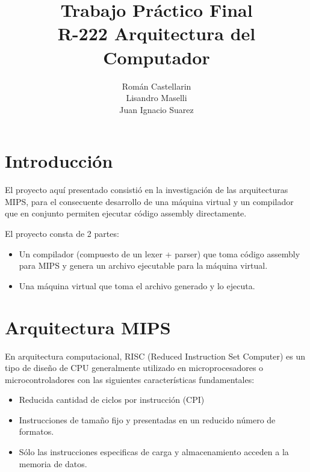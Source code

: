 \documentclass[12pt]{article}
\begin{document}
\title{
Trabajo Práctico Final \\
\large R-222 Arquitectura del Computador}
\author{ Román Castellarin\\
Lisandro Maselli\\
Juan Ignacio Suarez}
\maketitle
\section{Introducción}
El proyecto aquí presentado consistió en la investigación de las arquitecturas MIPS, para el consecuente desarrollo de una máquina virtual y un compilador que en conjunto permiten ejecutar código assembly directamente.

El proyecto consta de 2 partes:
\begin{itemize}
\item Un compilador (compuesto de un lexer + parser) que toma código assembly para MIPS y genera un archivo ejecutable para la máquina virtual.
\item Una máquina virtual que toma el archivo generado y lo ejecuta.
\end{itemize}    

\section{Arquitectura MIPS}
En arquitectura computacional, RISC (Reduced Instruction Set Computer) es un tipo de diseño de CPU generalmente utilizado en microprocesadores
o microcontroladores con las siguientes características fundamentales:
\begin{itemize}
\item Reducida cantidad de ciclos por instrucción (CPI)
\item Instrucciones de tamaño fijo y presentadas en un reducido número de formatos.
\item Sólo las instrucciones especificas de carga y almacenamiento acceden a la memoria de datos.
\end{itemize}
\end{document}
